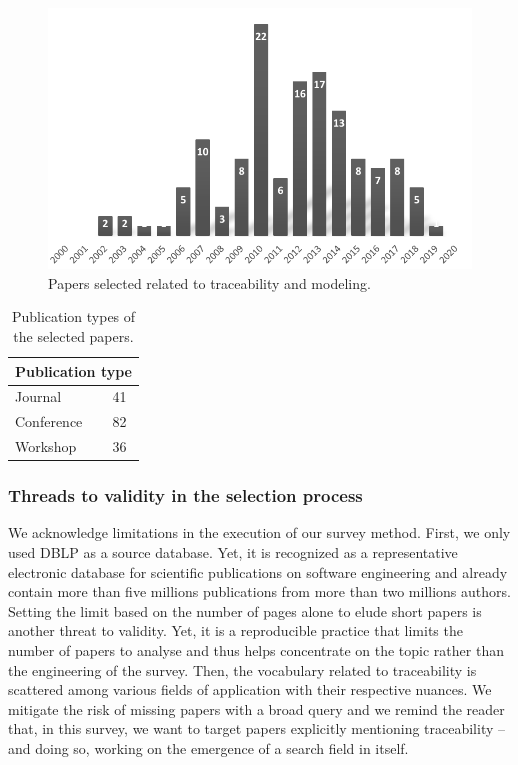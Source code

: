 \begin{figure}[h]
	\centering
	\includegraphics[width=.6\linewidth]{images/publicationyears-tm}
	\caption{Papers selected related to traceability and modeling. }
	\label{fig:publicationyears-tm}	
\end{figure}

\begin{table}[h]
\centering
	\begin{tabular}{|ll|}
		\hline
		\multicolumn{2}{|l|}{\textbf{Publication type}}  \\ \hline
		\multicolumn{1}{|l}{Journal}          & 41       \\ \hline
		\multicolumn{1}{|l}{Conference}       & 82       \\ \hline
		\multicolumn{1}{|l}{Workshop}         & 36       \\ \hline
	\end{tabular}
	\caption{Publication types of the selected papers.}
	\label{tab:classification-tm}
\end{table}



\subsubsection{Threads to validity in the selection process}
We acknowledge limitations in the execution of our survey method. 
First, we only used DBLP as a source database. Yet, it is recognized as a {representative} electronic database for scientific publications on software engineering and already contain more than five millions publications from more than two millions authors.
Setting the limit based on the number of pages alone to elude short papers is another threat to validity. Yet, it is a reproducible practice that limits the number of papers to analyse and thus helps concentrate on the topic rather than the engineering of the survey. 
Then, the vocabulary related to traceability is scattered among various fields of application with their respective nuances. We mitigate the risk of missing papers with a broad query and we remind the reader that, in this survey, we want to target papers explicitly mentioning traceability -- and doing so, working on the emergence of a search field in itself. 

